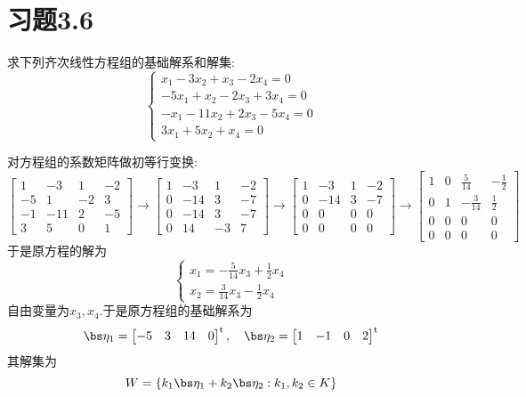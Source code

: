 \documentclass{ctexart}
\begin{document}
\section*{习题3.6}
\begin{homework}[1(1)]
    求下列齐次线性方程组的基础解系和解集:
    \[\left\{\begin{array}{l}
        x_1-3x_2+x_3-2x_4=0\\
        -5x_1+x_2-2x_3+3x_4=0\\
        -x_1-11x_2+2x_3-5x_4=0\\
        3x_1+5x_2+x_4=0
    \end{array}\right.\]
\end{homework}
\begin{solution}
    对方程组的系数矩阵做初等行变换:
    \[\begin{bmatrix}
        1&-3&1&-2\\
        -5&1&-2&3\\
        -1&-11&2&-5\\
        3&5&0&1
    \end{bmatrix}\longrightarrow\begin{bmatrix}
        1&-3&1&-2\\
        0&-14&3&-7\\
        0&-14&3&-7\\
        0&14&-3&7
    \end{bmatrix}\longrightarrow\begin{bmatrix}
        1&-3&1&-2\\
        0&-14&3&-7\\
        0&0&0&0\\
        0&0&0&0
    \end{bmatrix}\longrightarrow\begin{bmatrix}
        1&0&\frac{5}{14}&-\frac12\\
        0&1&-\frac{3}{14}&\frac12\\
        0&0&0&0\\
        0&0&0&0
    \end{bmatrix}\]
    于是原方程的解为
    \[\left\{\begin{array}{l}
        x_1=-\frac{5}{14}x_3+\frac12x_4\\
        x_2=\frac{3}{14}x_3-\frac12x_4
    \end{array}\right.\]
    自由变量为$x_3,x_4$.于是原方程组的基础解系为
    \[\bs\eta_1=\begin{bmatrix}
        -5&3&14&0
    \end{bmatrix}^{\text{t}},\quad\bs\eta_2=\begin{bmatrix}
        1&-1&0&2
    \end{bmatrix}^\text{t}\]
    其解集为
    \[W=\left\{k_1\bs\eta_1+k_2\bs\eta_2:k_1,k_2\in K\right\}\]
\end{solution}
\end{document}
